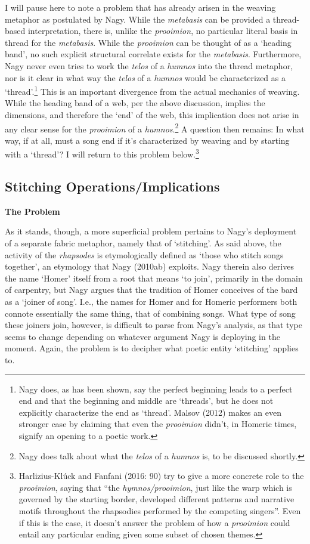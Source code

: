 \documentclass[12pt]{article}
\begin{document}
I will pause here to note a problem that has already arisen in the weaving metaphor as postulated by Nagy. While the \textit{metabasis} can be provided a thread-based interpretation, there is, unlike the \textit{prooimion}, no particular literal basis in thread for the \textit{metabasis}. While the \textit{prooimion} can be thought of as a `heading band', no such explicit structural correlate exists for the \textit{metabasis}. Furthermore, Nagy never even tries to work the \textit{telos} of a \textit{humnos} into the thread metaphor, nor is it clear in what way the \textit{telos} of a \textit{humnos} would be characterized as a `thread'.\footnote{ Nagy does, as has been shown, say the perfect beginning leads to a perfect end and that the beginning and middle are `threads', but he does not explicitly characterize the end as `thread'. Malsov (2012) makes an even stronger case by claiming that even the \textit{prooimion} didn't, in Homeric times, signify an opening to a poetic work.} This is an important divergence from the actual mechanics of weaving. While the heading band of a web, per the above discussion, implies the dimensions, and therefore the `end' of the web, this implication does not arise in any clear sense for the \textit{prooimion} of a \textit{humnos}.\footnote{ Nagy does talk about what the \textit{telos} of a \textit{humnos} is, to be discussed shortly.} A question then remains: In what way, if at all, must a song end if it's characterized by weaving and by starting with a `thread'? I will return to this problem below.\footnote{ Harlizius-Kl\'{u}ck and Fanfani (2016: 90) try to give a more concrete role to the \textit{prooimion}, saying that ``the \textit{hymnos/prooimion}, just like the warp which is governed by the starting border, developed different patterns and narrative motifs throughout the rhapsodies performed by the competing singers''. Even if this is the case, it doesn't answer the problem of how a \textit{prooimion} could entail any particular ending given some subset of chosen themes.}

\subsection{Stitching Operations/Implications}

\textbf{The Problem}

As it stands, though, a more superficial problem pertains to Nagy's deployment of a separate fabric metaphor, namely that of `stitching'. As said above, the activity of the \textit{rhapsodes} is etymologically defined as `those who stitch songs together', an etymology that Nagy (2010ab) exploits. Nagy therein also derives the name `Homer' itself from a root that means `to join', primarily in the domain of carpentry, but Nagy argues that the tradition of Homer conceives of the bard as a `joiner of song'. I.e., the names for Homer and for Homeric performers both connote essentially the same thing, that of combining songs. What type of song these joiners join, however, is difficult to parse from Nagy's analysis, as that type seems to change depending on whatever argument Nagy is deploying in the moment. Again, the problem is to decipher what poetic entity `stitching' applies to.
\end{document}
